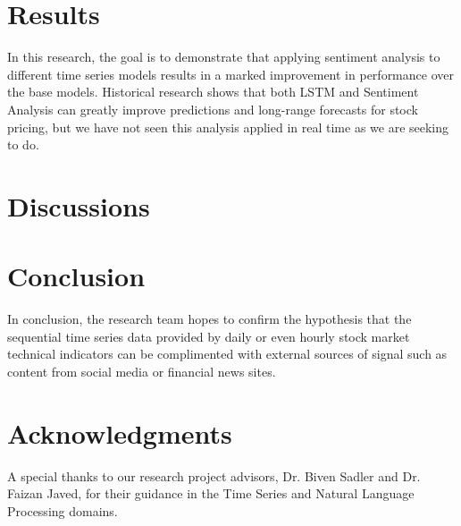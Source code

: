\documentclass{llncs}
\begin{document}
\section{Results}

In this research, the goal is to demonstrate that applying sentiment analysis to different time series models results in a marked improvement in performance over the base models. Historical research shows that both LSTM and Sentiment Analysis can greatly improve predictions and long-range forecasts for stock pricing, but we have not seen this analysis applied in real time as we are seeking to do.


\section{Discussions}

\section{Conclusion}


In conclusion, the research team hopes to confirm the hypothesis that the sequential time series data provided by daily or even hourly stock market technical indicators can be complimented with external sources of signal such as content from social media or financial news sites.

\section{Acknowledgments}

A special thanks to our research project advisors, Dr. Biven Sadler and Dr. Faizan Javed, for their guidance in the Time Series and Natural Language Processing domains.


%
%
%
% 
% 
%

\newpage
\end{document}

